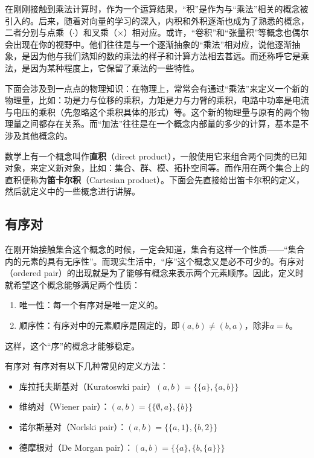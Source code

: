 
在刚刚接触到乘法计算时，作为一个运算结果，“积”是作为与“乘法”相关的概念被引入的。后来，随着对向量的学习的深入，内积和外积逐渐也成为了熟悉的概念，二者分别与点乘（$\cdot$）和叉乘（$\times$）相对应。或许，“卷积”和“张量积”等概念也偶尔会出现在你的视野中。他们往往是与一个逐渐抽象的“乘法”相对应，说他逐渐抽象，是因为他与我们熟知的数的乘法的样子和计算方法相去甚远。而还称呼它是乘法，是因为某种程度上，它保留了乘法的一些特性。

下面会涉及到一点点的物理知识：在物理上，常常会有通过“乘法”来定义一个新的物理量，比如：功是力与位移的乘积，力矩是力与力臂的乘积，电路中功率是电流与电压的乘积（先忽略这个乘积具体的形式）等。这个新的物理量与原有的两个物理量之间都存在关系。而“加法”往往是在一个概念内部量的多少的计算，基本是不涉及其他概念的。

数学上有一个概念叫作\textbf{直积}（direct product），一般使用它来组合两个同类的已知对象，来定义新对象，比如：集合、群、模、拓扑空间等。而作用在两个集合上的直积便称为\textbf{笛卡尔积}（Cartesian product）。下面会先直接给出笛卡尔积的定义，然后就定义中的一些概念进行讲解。



\subsection{有序对}

在刚开始接触集合这个概念的时候，一定会知道，集合有这样一个性质——“集合内的元素的具有无序性”。而现实生活中，“序”这个概念又是必不可少的。有序对（ordered pair）的出现就是为了能够有概念来表示两个元素顺序。因此，定义时就希望这个概念能够满足两个性质：

\begin{enumerate}
\item 唯一性：每一个有序对是唯一定义的。
\item 顺序性：有序对中的元素顺序是固定的，即$(a, b) \neq (b, a)$，除非$a = b$。
\end{enumerate}

这样，这个“序”的概念才能够稳定。


\begin{definition}{有序对}
有序对有以下几种常见的定义方法：
\begin{itemize}
\item 库拉托夫斯基对（Kuratoswki pair）$(a, b) = \{\{a\}, \{a, b\}\}$
\item 维纳对（Wiener pair）：$ (a, b) = \{\{\emptyset, a\}, \{b\}\} $
\item 诺尔斯基对（Norlski pair）：$ (a, b) = \{\{a, 1\}, \{b, 2\}\} $
\item 德摩根对（De Morgan pair）：$ (a, b) = \{\{a\}, \{b, \{a\}\}\}$
\end{itemize}
\end{definition}

